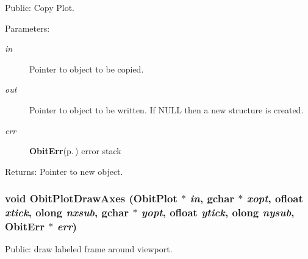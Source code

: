 Public: Copy Plot. 

\begin{Desc}
\item[Parameters:]
\begin{description}
\item[{\em in}]Pointer to object to be copied. \item[{\em out}]Pointer to object to be written. If NULL then a new structure is created. \item[{\em err}]{\bf Obit\-Err}{\rm (p.\,\pageref{structObitErr})} error stack \end{description}
\end{Desc}
\begin{Desc}
\item[Returns:]Pointer to new object. \end{Desc}
\subsubsection{\setlength{\rightskip}{0pt plus 5cm}void Obit\-Plot\-Draw\-Axes ({\bf Obit\-Plot} $\ast$ {\em in}, gchar $\ast$ {\em xopt}, {\bf ofloat} {\em xtick}, {\bf olong} {\em nxsub}, gchar $\ast$ {\em yopt}, {\bf ofloat} {\em ytick}, {\bf olong} {\em nysub}, {\bf Obit\-Err} $\ast$ {\em err})}\label{ObitPlot_8h_a17}


Public: draw labeled frame around viewport. 

